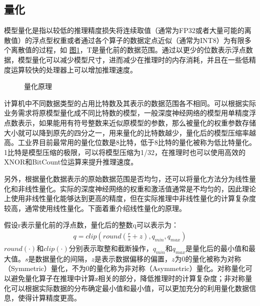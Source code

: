 \documentclass[letterpaper,10pt,english]{sphinxmanual}
\let\sphinxpxdimen\pdfpxdimen\else\newdimen\sphinxpxdimen
\begin{document}
\subsection{量化}
\label{\detokenize{chapter_model_deployment/model_compression:id2}}
\sphinxAtStartPar
模型量化是指以较低的推理精度损失将连续取值（通常为FP32或者大量可能的离散值）的浮点型权重或者通过各个算子的数据定点近似（通常为INT8）为有限多个离散值的过程，如
\hyperref[\detokenize{chapter_model_deployment/model_compression:ch08-fig-quant-minmax}]{图\ref{\detokenize{chapter_model_deployment/model_compression:ch08-fig-quant-minmax}}}，T是量化前的数据范围。通过以更少的位数表示浮点数据，模型量化可以减少模型尺寸，进而减少在推理时的内存消耗，并且在一些低精度运算较快的处理器上可以增加推理速度。

\begin{figure}[H]
\centering
\capstart

\noindent\sphinxincludegraphics[width=300\sphinxpxdimen]{{quant-minmax}.png}
\caption{量化原理}\label{\detokenize{chapter_model_deployment/model_compression:id10}}\label{\detokenize{chapter_model_deployment/model_compression:ch08-fig-quant-minmax}}\end{figure}

\sphinxAtStartPar
计算机中不同数据类型的占用比特数及其表示的数据范围各不相同。可以根据实际业务需求将原模型量化成不同比特数的模型，一般深度神经网络的模型用单精度浮点数表示，如果能用有符号整数来近似原模型的参数，那么被量化的权重参数存储大小就可以降到原先的四分之一，用来量化的比特数越少，量化后的模型压缩率越高。工业界目前最常用的量化位数是8比特，低于8比特的量化被称为低比特量化。1比特是模型压缩的极限，可以将模型压缩为1/32，在推理时也可以使用高效的XNOR和BitCount位运算来提升推理速度。

\sphinxAtStartPar
另外，根据量化数据表示的原始数据范围是否均匀，还可以将量化方法分为线性量化和非线性量化。实际的深度神经网络的权重和激活值通常是不均匀的，因此理论上使用非线性量化能够达到更高的精度，但在实际推理中非线性量化的计算复杂度较高，通常使用线性量化。下面着重介绍线性量化的原理。

\sphinxAtStartPar
假设r表示量化前的浮点数，量化后的整数q可以表示为：
\begin{equation}\label{equation:chapter_model_deployment/model_compression:chapter_model_deployment/model_compression:0}
\begin{split}q=clip(round(\frac{r}{s}+z),q_{min},q_{max})\end{split}
\end{equation}
\sphinxAtStartPar
\(round(\cdot)\)和\(clip(\cdot)\)分别表示取整和截断操作，\(q_{min}\)和\(q_{max}\)是量化后的最小值和最大值。\(s\)是数据量化的间隔，\(z\)是表示数据偏移的偏置，\(z\)为0的量化被称为对称（Symmetric）量化，不为0的量化称为非对称（Asymmetric）量化。对称量化可以避免量化算子在推理中计算z相关的部分，降低推理时的计算复杂度；非对称量化可以根据实际数据的分布确定最小值和最小值，可以更加充分的利用量化数据信息，使得计算精度更高。
\end{document}
